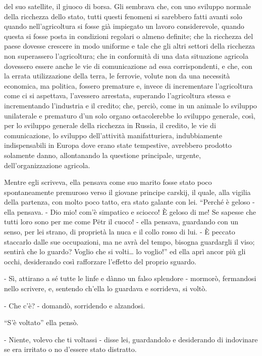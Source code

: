 del suo satellite, il giuoco di borsa. Gli sembrava che, con uno sviluppo normale della ricchezza dello stato, tutti questi fenomeni si sarebbero fatti avanti solo quando nell'agricoltura si fosse già impiegato un lavoro considerevole, quando questa si fosse posta in condizioni regolari o almeno definite; che la ricchezza del paese dovesse crescere in modo uniforme e tale che gli altri settori della ricchezza non superassero l'agricoltura; che in conformità di una data situazione agricola dovessero essere anche le vie di comunicazione ad essa corrispondenti, e che, con la errata utilizzazione della terra, le ferrovie, volute non da una necessità economica, ma politica, fossero premature e, invece di incrementare l'agricoltura come ci si aspettava, l'avessero arrestata, superando l'agricoltura stessa e incrementando l'industria e il credito; che, perciò, come in un animale lo sviluppo unilaterale e prematuro d'un solo organo ostacolerebbe lo sviluppo generale, così, per lo sviluppo generale della ricchezza in Russia, il credito, le vie di comunicazione, lo sviluppo dell'attività manifatturiera, indubbiamente indispensabili in Europa dove erano state tempestive, avrebbero prodotto solamente danno, allontanando la questione principale, urgente, dell'organizzazione agricola. 

Mentre egli scriveva, ella pensava come suo marito fosse stato poco spontaneamente premuroso verso il giovane principe carskij, il quale, alla vigilia della partenza, con molto poco tatto, era stato galante con lei. ``Perché è geloso - ella pensava. - Dio mio! com'è simpatico e sciocco! È geloso di me! Se sapesse che tutti loro sono per me come Pëtr il cuoco! - ella pensava, guardando con un senso, per lei strano, di proprietà la nuca e il collo rosso di lui. - È peccato staccarlo dalle sue occupazioni, ma ne avrà del tempo, bisogna guardargli il viso; sentirà che lo guardo? Voglio che si volti\ldots{} lo voglio!'' ed ella aprì ancor più gli occhi, desiderando così rafforzare l'effetto del proprio sguardo. 

- Sì, attirano a sé tutte le linfe e dànno un falso splendore - mormorò, fermandosi nello scrivere, e, sentendo ch'ella lo guardava e sorrideva, si voltò. 

- Che c'è? - domandò, sorridendo e alzandosi. 

``S'è voltato'' ella pensò. 

- Niente, volevo che ti voltassi - disse lei, guardandolo e desiderando di indovinare se era irritato o no d'essere stato distratto. 

